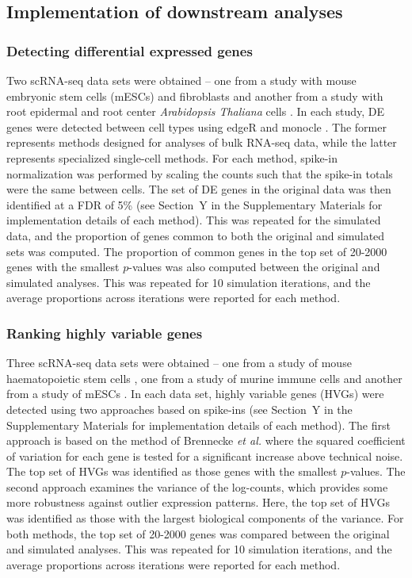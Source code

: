 \documentclass{article}
\begin{document}
\subsection{Implementation of downstream analyses}

\subsubsection{Detecting differential expressed genes}
Two scRNA-seq data sets were obtained -- one from a study with mouse embryonic stem cells (mESCs) and fibroblasts \cite{islam2011characterization} and another from a study with root epidermal and root center \textit{Arabidopsis Thaliana} cells \cite{brennecke2013accounting}.
In each study, DE genes were detected between cell types using edgeR \cite{robinson2010edgeR,lund2012detecting} and monocle \cite{trapnell2014dynamics}.
The former represents methods designed for analyses of bulk RNA-seq data, while the latter represents specialized single-cell methods.
For each method, spike-in normalization was performed by scaling the counts such that the spike-in totals were the same between cells.
The set of DE genes in the original data was then identified at a FDR of 5\% (see Section~Y in the Supplementary Materials for implementation details of each method).
This was repeated for the simulated data, and the proportion of genes common to both the original and simulated sets was computed.
The proportion of common genes in the top set of 20-2000 genes with the smallest $p$-values was also computed between the original and simulated analyses.
This was repeated for 10 simulation iterations, and the average proportions across iterations were reported for each method.

\subsubsection{Ranking highly variable genes}
Three scRNA-seq data sets were obtained -- one from a study of mouse haematopoietic stem cells \cite{wilson2015combined}, one from a study of murine immune cells \cite{brennecke2013accounting} and another from a study of mESCs \cite{islam2014quantitative}.
In each data set, highly variable genes (HVGs) were detected using two approaches based on spike-ins (see Section~Y in the Supplementary Materials for implementation details of each method).
The first approach is based on the method of Brennecke \textit{et al.} \cite{brennecke2013accounting} where the squared coefficient of variation for each gene is tested for a significant increase above technical noise.
The top set of HVGs was identified as those genes with the smallest $p$-values.
The second approach examines the variance of the log-counts, which provides some more robustness against outlier expression patterns.
Here, the top set of HVGs was identified as those with the largest biological components of the variance.
For both methods, the top set of 20-2000 genes was compared between the original and simulated analyses.
This was repeated for 10 simulation iterations, and the average proportions across iterations were reported for each method.
\end{document}
